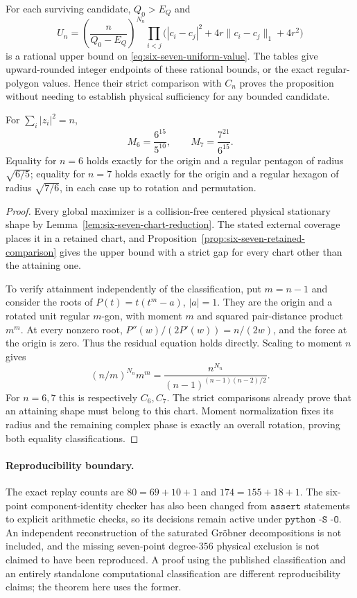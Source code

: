 For each surviving candidate, $Q_0>E_Q$ and
\begin{equation}\label{eq:six-seven-rational-upper}
 U_n=\left(\frac n{Q_0-E_Q}\right)^{N_n}
 \prod_{i<j}\bigl(|c_i-c_j|^2+4r\|c_i-c_j\|_1+4r^2\bigr)
\end{equation}
is a rational upper bound on \eqref{eq:six-seven-uniform-value}.
The tables give upward-rounded integer endpoints of these rational
bounds, or the exact regular-polygon values. Hence their strict
comparison with $C_n$ proves the proposition without needing to
establish physical sufficiency for any bounded candidate.

\begin{theorem}
\label{thm:six-seven-global-improved}
For $\sum_i|z_i|^2=n$,
\[
 M_6=\frac{6^{15}}{5^{10}},\qquad
 M_7=\frac{7^{21}}{6^{15}}.
\]
Equality for $n=6$ holds exactly for the origin and a regular
pentagon of radius $\sqrt{6/5}$; equality for $n=7$ holds exactly
for the origin and a regular hexagon of radius $\sqrt{7/6}$,
in each case up to rotation and permutation.
\end{theorem}
\begin{proof}
Every global maximizer is a collision-free centered physical stationary
shape by Lemma~\ref{lem:six-seven-chart-reduction}. The stated external
coverage places it in a retained chart, and
Proposition~\ref{prop:six-seven-retained-comparison} gives the upper
bound with a strict gap for every chart other than the attaining one.

To verify attainment independently of the classification, put
$m=n-1$ and consider the roots of $P(t)=t(t^m-a)$, $|a|=1$.
They are the origin and a rotated unit regular $m$-gon, with moment
$m$ and squared pair-distance product $m^m$. At every nonzero root,
$P''(w)/(2P'(w))=n/(2w)$, and the force at the origin is zero.
Thus the residual equation holds directly. Scaling to moment $n$
gives
\[
 (n/m)^{N_n}m^m
 =\frac{n^{N_n}}{(n-1)^{(n-1)(n-2)/2}}.
\]
For $n=6,7$ this is respectively $C_6,C_7$.
The strict comparisons already prove that an attaining shape must
belong to this chart. Moment normalization fixes its radius and
the remaining complex phase is exactly an overall rotation, proving
both equality classifications.
\end{proof}

\paragraph{Reproducibility boundary.}
The exact replay counts are $80=69+10+1$ and $174=155+18+1$.
The six-point component-identity checker has also been changed from
$\texttt{assert}$ statements to explicit arithmetic checks, so its
decisions remain active under $\texttt{python -S -O}$.
An independent reconstruction of the saturated Gr\"obner decompositions
is not included, and the missing seven-point degree-$356$ physical
exclusion is not claimed to have been reproduced. A proof using the
published classification and an entirely standalone computational
classification are different reproducibility claims; the theorem here
uses the former.
